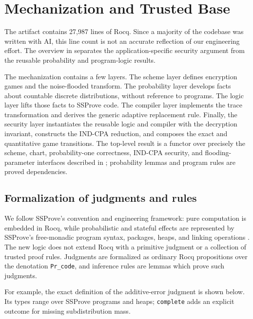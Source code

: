 \section{Mechanization and Trusted Base}
\label{sec:artifact}

The artifact contains 27,987 lines of Rocq.
Since a majority of the codebase was written with AI,
this line count is not an accurate reflection of our engineering effort.
The overview in  separates the application-specific
security argument from the reusable probability and program-logic results.

The mechanization contains a few layers.  The scheme layer
defines encryption games and the noise-flooded transform.  The
probability layer develops facts about countable discrete distributions,
without reference to programs.  The logic layer lifts those facts to SSProve
code.  The compiler layer implements the trace transformation and derives the
generic adaptive replacement rule.  Finally, the security
layer instantiates the reusable logic and compiler with the decryption
invariant, constructs the IND-CPA reduction, and composes the exact and
quantitative game transitions.
The top-level result is a functor over precisely the scheme, chart,
probability-one correctness, IND-CPA security, and flooding-parameter
interfaces described in ; probability lemmas and
program rules are proved dependencies.

\subsection{Formalization of judgments and rules}

We follow SSProve's convention and engineering framework: pure computation is
embedded in Rocq, while probabilistic and stateful effects are represented by
SSProve's free-monadic program syntax, packages, heaps, and linking operations
\cite{ssprove}.  The new logic does not extend Rocq with a primitive judgment
or a collection of trusted proof rules.
Judgments are formalized as ordinary Rocq propositions over the denotation \texttt{Pr\_code},
and inference rules are lemmas which prove such judgments.

For example, the exact definition of the additive-error judgment is shown
below.  Its types range over SSProve programs and heaps; \texttt{complete}
adds an explicit outcome for missing subdistribution mass.

